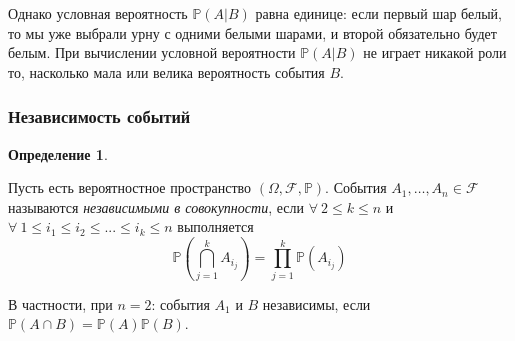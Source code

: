 \documentclass[oneside,final,14pt]{extreport}
\newcommand\myprob[1]{{\mathbb{P}(#1)}}
\theoremstyle{definition}
\newtheorem{defn}{Определение}[section]
\begin{document}
Однако условная вероятность $\myprob{A | B}$ равна единице: если первый шар
белый, то мы уже выбрали урну с одними белыми шарами, и второй обязательно будет белым. При вычислении условной вероятности $\myprob{A | B}$ не
играет никакой роли то, насколько мала или велика вероятность события $B$.

\subsubsection{Независимость событий}

\begin{defn}
    
\end{defn}
    Пусть есть вероятностное пространство $(\Omega, \mathcal{F}, \mathbb{P})$. События $A_1, \ldots, A_n \in \mathcal{F}$ называются {\it независимыми в совокупности}, если $\forall~2 \leqslant k \leqslant n$ и $\forall~1 \leqslant i_1 \leqslant i_2 \leqslant ... \leqslant i_k \leqslant n$ выполняется 
    \begin{equation*}
        \myprob {\bigcap\limits_{j=1}^k A_{i_j}} = \prod\limits_{j=1}^k \myprob{A_{i_j}}
    \end{equation*}

В частности, при $n = 2$: события $A_1$ и $B$ независимы, если $\myprob{A \cap B} = \myprob{A}\myprob{B}$.
\end{document}
